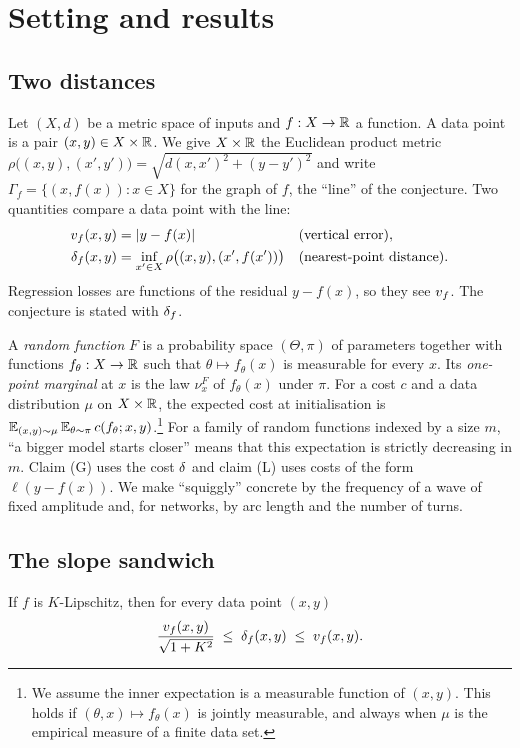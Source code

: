 \section{Setting and results}
\label{sec:theory}

\subsection{Two distances}

Let $(X,d)$ be a metric space of inputs and $f:X\to\mathbb{R}$ a function. A data point
is a pair $(x,y)\in X\times\mathbb{R}$. We give $X\times\mathbb{R}$ the Euclidean product metric
$\rho\bigl((x,y),(x',y')\bigr)=\sqrt{d(x,x')^2+(y-y')^2}$ and write
$\Gamma_f=\{(x,f(x)):x\in X\}$ for the graph of $f$, the ``line'' of the
conjecture. Two quantities compare a data point with the line:
\begin{align*}
  v_f(x,y) &= |y-f(x)| && \text{(vertical error)},\\
  \delta_f(x,y) &= \inf_{x'\in X}\rho\bigl((x,y),(x',f(x'))\bigr) && \text{(nearest-point distance)}.
\end{align*}
Regression losses are functions of the residual $y-f(x)$, so they see $v_f$.
The conjecture is stated with $\delta_f$.

A \emph{random function} $F$ is a probability space $(\Theta,\pi)$ of parameters
together with functions $f_\theta:X\to\mathbb{R}$ such that $\theta\mapsto f_\theta(x)$
is measurable for every $x$. Its \emph{one-point marginal} at $x$ is the law
$\nu^F_x$ of $f_\theta(x)$ under $\pi$. For a cost $c$ and a data distribution
$\mu$ on $X\times\mathbb{R}$, the expected cost at initialisation is
$\mathbb{E}_{(x,y)\sim\mu}\,\mathbb{E}_{\theta\sim\pi}\,c(f_\theta;x,y)$.\footnote{We assume the
inner expectation is a measurable function of $(x,y)$. This holds if
$(\theta,x)\mapsto f_\theta(x)$ is jointly measurable, and always when $\mu$ is
the empirical measure of a finite data set.} For a family of random functions
indexed by a size $m$, ``a bigger model starts closer'' means that this
expectation is strictly decreasing in $m$. Claim (G) uses the cost $\delta$ and
claim (L) uses costs of the form $\ell(y-f(x))$. We make ``squiggly'' concrete
by the frequency of a wave of fixed amplitude and, for networks, by arc length
and the number of turns.

\subsection{The slope sandwich}

\begin{theorem}\label{thm:sandwich}
If $f$ is $K$-Lipschitz, then for every data point $(x,y)$
\[
  \frac{v_f(x,y)}{\sqrt{1+K^2}}\;\le\;\delta_f(x,y)\;\le\;v_f(x,y).
\]
\end{theorem}

